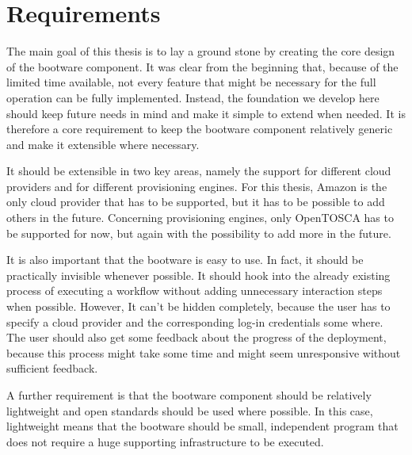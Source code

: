 \section{Requirements}

The main goal of this thesis is to lay a ground stone by creating the core design of the bootware component.
It was clear from the beginning that, because of the limited time available, not every feature that might be necessary for the full operation can be fully implemented.
Instead, the foundation we develop here should keep future needs in mind and make it simple to extend when needed.
It is therefore a core requirement to keep the bootware component relatively generic and make it extensible where necessary.

It should be extensible in two key areas, namely the support for different cloud providers and for different provisioning engines.
For this thesis, Amazon is the only cloud provider that has to be supported, but it has to be possible to add others in the future.
Concerning provisioning engines, only OpenTOSCA has to be supported for now, but again with the possibility to add more in the future.

It is also important that the bootware is easy to use.
In fact, it should be practically invisible whenever possible.
It should hook into the already existing process of executing a workflow without adding unnecessary interaction steps when possible.
However, It can't be hidden completely, because the user has to specify a cloud provider and the corresponding log-in credentials some where.
The user should also get some feedback about the progress of the deployment, because this process might take some time and might seem unresponsive without sufficient feedback.

A further requirement is that the bootware component should be relatively lightweight and open standards should be used where possible.
In this case, lightweight means that the bootware should be small, independent program that does not require a huge supporting infrastructure to be executed.

